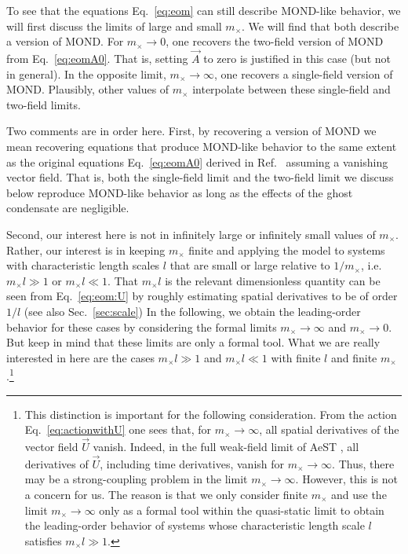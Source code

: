 \documentclass[reprint, amsmath,amssymb, nofootinbib, aps, prd]{revtex4-2}
\begin{document}
To see that the equations Eq.~\eqref{eq:eom} can still describe MOND-like behavior, we will first discuss the limits of large and small $m_\times$.
We will find that both describe a version of MOND.
For $m_\times \to 0$, one recovers the two-field version of MOND from Eq.~\eqref{eq:eomA0}.
That is, setting $\vec{A}$ to zero is justified in this case (but not in general).
In the opposite limit, $m_\times \to \infty$, one recovers a single-field version of MOND.
Plausibly, other values of $m_\times$ interpolate between these single-field and two-field limits.

Two comments are in order here.
First, by recovering a version of MOND we mean recovering equations that produce MOND-like behavior to the same extent as the original equations Eq.~\eqref{eq:eomA0} derived in Ref.~\cite{Skordis2020} assuming a vanishing vector field.
That is, both the single-field limit and the two-field limit we discuss below reproduce MOND-like behavior as long as the effects of the ghost condensate are negligible.

Second, our interest here is not in infinitely large or infinitely small values of $m_\times$.
Rather, our interest is in keeping $m_\times$ finite and applying the model to systems with characteristic length scales $l$ that are small or large relative to $1/m_\times$, i.e. $m_\times l \gg 1$ or $m_\times l \ll 1$.
That $m_\times l$ is the relevant dimensionless quantity can be seen from Eq.~\eqref{eq:eom:U} by roughly estimating spatial derivatives to be of order $1/l$ (see also Sec.~\ref{sec:scale})
In the following, we obtain the leading-order behavior for these cases by considering the formal limits $m_\times \to \infty$ and $m_\times \to 0$.
But keep in mind that these limits are only a formal tool.
What we are really interested in here are the cases $m_\times l \gg 1$ and $m_\times l \ll 1$ with finite $l$ and finite $m_\times$.\footnote{
  This distinction is important for the following consideration.
  From the action Eq.~\eqref{eq:actionwithU} one sees that, for $m_\times \to \infty$, all spatial derivatives of the vector field $\vec{U}$ vanish.
  Indeed, in the full weak-field limit of AeST \cite{Skordis2021}, all derivatives of $\vec{U}$, including time derivatives, vanish for $m_\times \to \infty$.
  Thus, there may be a strong-coupling problem in the limit $m_\times \to \infty$.
  However, this is not a concern for us.
  The reason is that we only consider finite $m_\times$ and use the limit $m_\times \to \infty$ only as a formal tool within the quasi-static limit to obtain the leading-order behavior of systems whose characteristic length scale $l$ satisfies $m_\times l \gg 1$.
}
\end{document}

